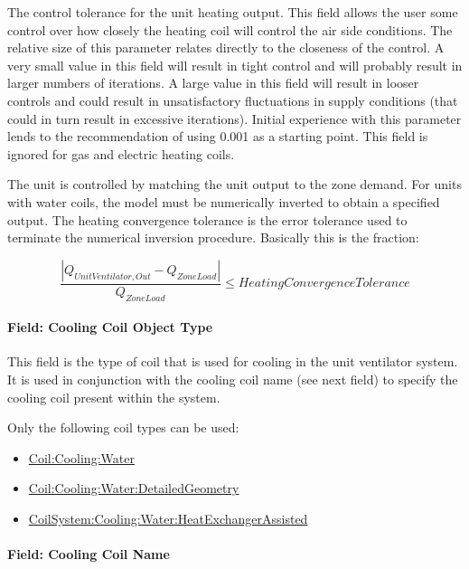 The control tolerance for the unit heating output. This field allows the user some control over how closely the heating coil will control the air side conditions. The relative size of this parameter relates directly to the closeness of the control. A very small value in this field will result in tight control and will probably result in larger numbers of iterations. A large value in this field will result in looser controls and could result in unsatisfactory fluctuations in supply conditions (that could in turn result in excessive iterations). Initial experience with this parameter lends to the recommendation of using 0.001 as a starting point. This field is ignored for gas and electric heating coils.

The unit is controlled by matching the unit output to the zone demand. For units with water coils, the model must be numerically inverted to obtain a specified output. The heating convergence tolerance is the error tolerance used to terminate the numerical inversion procedure. Basically this is the fraction:

\begin{equation}
\frac{{\left| {{Q_{UnitVentilator,Out}} - {Q_{ZoneLoad}}} \right|}}{{{Q_{ZoneLoad}}}} \le HeatingConvergenceTolerance
\end{equation}

\paragraph{Field: Cooling Coil Object Type}\label{field-cooling-coil-object-type-1-001}

This field is the type of coil that is used for cooling in the unit ventilator system. It is used in conjunction with the cooling coil name (see next field) to specify the cooling coil present within the system.

Only the following coil types can be used:

\begin{itemize}
\item
  \hyperref[coilcoolingwater]{Coil:Cooling:Water}
\item
  \hyperref[coilcoolingwaterdetailedgeometry]{Coil:Cooling:Water:DetailedGeometry}
\item
  \hyperref[coilsystemcoolingwaterheatexchangerassisted]{CoilSystem:Cooling:Water:HeatExchangerAssisted}
\end{itemize}

\paragraph{Field: Cooling Coil Name}\label{field-cooling-coil-name-1-001}

